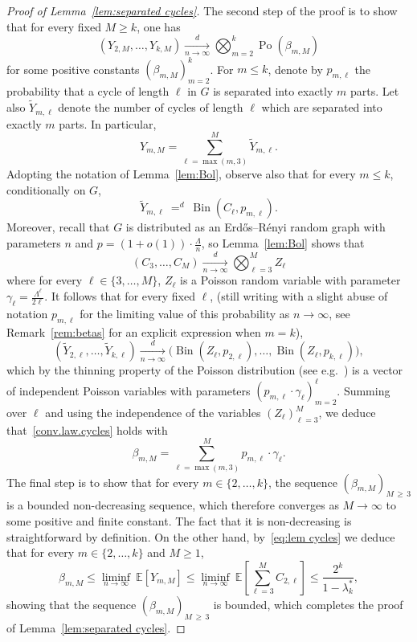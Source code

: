 \documentclass[10pt]{amsart}
\theoremstyle{definition}\newtheorem{defi}[theo]{Definition}\newtheorem{rema}[theo]{Remark}\newtheorem{exam}[theo]{Example}\newtheorem{exem}[theo]{Example}\newtheorem{nota}[theo]{Notation}
\newcommand{\bbE}{\mathbb{E}}
\DeclareMathOperator{\rPo}{Po}
\DeclareMathOperator{\rBin}{Bin}
\begin{document}
\begin{proof}[Proof of Lemma~\ref{lem:separated cycles}]
The second step of the proof is to show that for every fixed $M\ge k$, one has
\begin{equation}\label{conv.law.cycles}
(Y_{2,M}, \ldots, Y_{k,M})\xrightarrow[n\to \infty]{d} \bigotimes_{m=2}^k \rPo(\beta_{m,M})
\end{equation}
for some positive constants $(\beta_{m,M})_{m=2}^k$. For $m \le k$, denote by $p_{m,\ell}$ the probability that a cycle of length $\ell$ in $G$ is separated into exactly $m$ parts. Let also $\widetilde Y_{m,\ell}$ denote the number of cycles of length $\ell$ which are separated into exactly $m$ parts. In particular,
\[
Y_{m,M} = \sum_{\ell = \max(m,3)}^M \widetilde Y_{m,\ell}.
\]
Adopting the notation of Lemma~\ref{lem:Bol}, observe also that for every $m\le k$, conditionally on $G$,
\[
\widetilde Y_{m,\ell}\ \mathop{=}^d\ \rBin(C_\ell,p_{m,\ell}).
\]
Moreover, recall that $G$ is distributed as an Erd\H{o}s--Rényi random graph with parameters $n$ and $p=(1+o(1))\cdot\tfrac{\Lambda}{n}$, so Lemma~\ref{lem:Bol} shows that
\[
(C_3,\dots,C_M) \xrightarrow[n\to \infty]{d} \bigotimes_{\ell = 3}^M Z_\ell
\]
where for every $\ell\in \{3,\dots,M\}$, $Z_\ell$ is a Poisson random variable with parameter $\gamma_\ell=\tfrac{\Lambda^\ell}{2\ell}$. It follows that for every fixed $\ell$, (still writing with a slight abuse of notation $p_{m,\ell}$ for the limiting value of this probability as $n\to \infty$, see Remark~\ref{rem:betas} for an explicit expression when $m=k$),
\[
\left(\widetilde Y_{2,\ell}, \dots, \widetilde Y_{k,\ell}\right)\xrightarrow[n\to \infty]{d}
\Big(\rBin(Z_\ell,p_{2,\ell}), \dots,\rBin(Z_\ell,p_{k,\ell})\Big),
\]
which by the thinning property of the Poisson distribution (see e.g.~\cite[Section~5.3]{LP17}) is a vector of independent Poisson variables with parameters $(p_{m,\ell}\cdot \gamma_\ell)_{m=2}^\ell$. Summing over $\ell$ and using the independence of the variables $(Z_\ell)_{\ell= 3}^M$, we deduce that~\eqref{conv.law.cycles} holds with
\[
\beta_{m,M} = \sum_{\ell = \max(m,3)}^M p_{m,\ell}\cdot \gamma_\ell.
\]
The final step is to show that for every $m\in \{2,\dots,k\}$, the sequence $(\beta_{m,M})_{M\,\ge\,3}$ is a bounded non-decreasing sequence, which therefore converges as $M\to \infty$ to some positive and finite constant. The fact that it is non-decreasing is straightforward by definition. On the other hand, by~\eqref{eq:lem cycles} we deduce that for every $m\in \{2,\dots,k\}$ and $M\ge 1$,
\[
\beta_{m,M} \le \liminf_{n\to \infty}\ \bbE[Y_{m,M}]\le \liminf_{n\to \infty} \ \bbE\left[\sum_{\ell=3}^{M} C_{2,\ell}\right]\le \frac{2^k}{1-\lambda_k^*},
\]
showing that the sequence $(\beta_{m,M})_{M\,\ge\,3}$ is bounded, which completes the proof of Lemma~\ref{lem:separated cycles}.
\end{proof}
\end{document}
